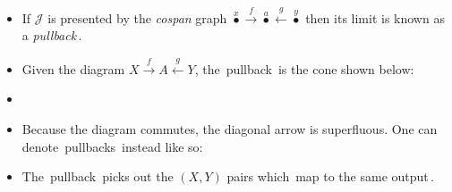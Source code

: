 \begin{itemize}
    \item If $\mathcal{J}$ is presented by the \emph{cospan} graph $\boxed{\overset{x}\bullet \xrightarrow{f} \overset{a}\bullet \xleftarrow{g}\overset{y}\bullet}$ then its limit is known as \,a \emph{pullback}\,.
    \item Given the diagram $X \xrightarrow{f}A\xleftarrow{g}Y$, the \,pullback\, is the cone shown below:

    \item {}

    \item Because the diagram commutes, the diagonal arrow is superfluous. One can denote \,pullbacks\, instead like so:


    \item The \,pullback\, picks out the $(X,Y)$ pairs which \,map to the same output\,.
  \end{itemize}